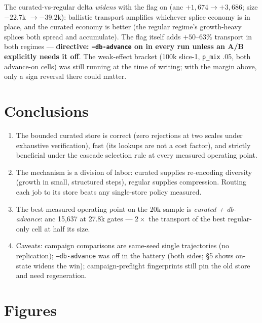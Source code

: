 \documentclass[11pt]{article}
\newcommand{\code}[1]{\texttt{#1}}
\begin{document}
The curated-vs-regular delta \emph{widens} with the flag on (anc $+1{,}674
\to +3{,}686$; size $-22.7$k $\to -39.2$k): ballistic transport amplifies
whichever splice economy is in place, and the curated economy is better
(the regular regime's growth-heavy splices both spread and accumulate).
The flag itself adds $+50$--$63\%$ transport in both regimes ---
\textbf{directive: \code{--db-advance} on in every run unless an A/B
explicitly needs it off}. The weak-effect bracket (100k slice-1,
\code{p\_mix} .05, both advance-on cells) was still running at the time of
writing; with the margin above, only a sign reversal there could matter.

\section{Conclusions}

\begin{enumerate}
\item The bounded curated store is correct (zero rejections at two scales
under exhaustive verification), fast (its lookups are not a cost factor),
and strictly beneficial under the cascade selection rule at every measured
operating point.
\item The mechanism is a division of labor: curated supplies re-encoding
diversity (growth in small, structured steps), regular supplies
compression. Routing each job to its store beats any single-store policy
measured.
\item The best measured operating point on the 20k sample is
\emph{curated + db-advance}: anc 15{,}637 at 27.8k gates --- $2\times$ the
transport of the best regular-only cell at half its size.
\item Caveats: campaign comparisons are same-seed single trajectories (no
replication); \code{--db-advance} was off in the battery (both sides;
\S5 shows on-state widens the win); campaign-preflight fingerprints still
pin the old store and need regeneration.
\end{enumerate}

\clearpage
\appendix
\section{Figures}
\end{document}
